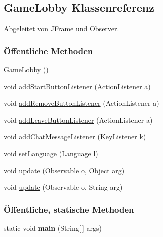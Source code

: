 \hypertarget{a00012}{\subsection{Game\-Lobby Klassenreferenz}
\label{a00012}
}


Abgeleitet von J\-Frame und Observer.

\subsubsection*{Öffentliche Methoden}
\begin{DoxyCompactItemize}
\item 
\hypertarget{a00012_af5c160b3c4448522e0d6e0002470c80e}{\hyperlink{a00012_af5c160b3c4448522e0d6e0002470c80e}{Game\-Lobby} ()}\label{a00012_af5c160b3c4448522e0d6e0002470c80e}

\item 
void \hyperlink{a00012_a865971050de64d103900e70b236a0b92}{add\-Start\-Button\-Listener} (Action\-Listener a)
\item 
void \hyperlink{a00012_ab66ade112f82eb29655a140d34bae4fd}{add\-Remove\-Button\-Listener} (Action\-Listener a)
\item 
void \hyperlink{a00012_aac8c97a2425ab3702a82bb0876aa3cc8}{add\-Leave\-Button\-Listener} (Action\-Listener a)
\item 
void \hyperlink{a00012_a1d0d058b74950bbf7305be79b1d60143}{add\-Chat\-Message\-Listener} (Key\-Listener k)
\item 
void \hyperlink{a00012_a9329ba7453dd661d50d2fb8024df3b2b}{set\-Language} (\hyperlink{a00015}{Language} l)
\item 
void \hyperlink{a00012_a2b67d42550fdf9ddd8f3878d0849965c}{update} (Observable o, Object arg)
\item 
void \hyperlink{a00012_a41caffb40957934b02960cf166c78494}{update} (Observable o, String arg)
\end{DoxyCompactItemize}
\subsubsection*{Öffentliche, statische Methoden}
\begin{DoxyCompactItemize}
\item 
\hypertarget{a00012_a8b260eecbaabcef8473fd87ada040682}{static void {\bfseries main} (String\mbox{[}$\,$\mbox{]} args)}\label{a00012_a8b260eecbaabcef8473fd87ada040682}

\end{DoxyCompactItemize}
